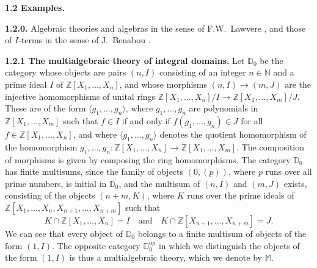 \documentclass{article}
\newenvironment{rmenv}[1]
  {\phantomsection\par\medskip\noindent\textbf{#1.}\rmfamily}
  {\par\medskip}
\newcommand{\bb}[1]{{\mathbb{#1}}}
\newcommand{\op}{{\mathrm{op}}}
\begin{document}
\begin{rmenv}{1.2 Examples}
\label{1.2}

  \begin{rmenv}{1.2.0}
  \label{1.2.0}
    Algebraic theories and algebras in the sense of F.W.~Lawvere \cite{6}, and those of $I$-terms in the sense of J.~Benabou \cite{1}.
  \end{rmenv}

  \begin{rmenv}{1.2.1 The multialgebraic theory of integral domains}
  \label{1.2.1}
    Let $\bb{D}_0$ be the category whose objects are pairs $(n,I)$ consisting of an integer $n\in\bb{N}$ and a prime ideal $I$ of $\bb{Z}[X_1,\ldots,X_n]$, and whose morphisms $(n,I)\to(m,J)$ are the injective homomorphisms of unital rings $\bb{Z}[X_1,\ldots,X_n]/I\to\bb{Z}[X_1,\ldots,X_m]/J$.
    These are of the form $\langle g_1,\ldots,g_n\rangle$, where $g_1,\ldots,g_n$ are polynomials in $\bb{Z}[X_1,\ldots,X_m]$ such that $f\in I$ if and only if $f(g_1,\ldots,g_n)\in J$ for all $f\in\bb{Z}[X_1,\ldots,X_n]$, and where $\langle g_1,\ldots,g_n\rangle$ denotes the quotient homomorphism of the homomorphism $g_1,\ldots,g_n\colon\bb{Z}[X_1,\ldots,X_n]\to\bb{Z}[X_1,\ldots,X_m]$.
    The composition of morphisms is given by composing the ring homomorphisms.
    The category $\bb{D}_0$ has finite multisums, since the family of objects $(0,(p))$, where $p$ runs over all prime numbers, is initial in $\bb{D}_0$, and the multisum of $(n,I)$ and $(m,J)$ exists, consisting of the objects $(n+m,K)$, where $K$ runs over the prime ideals of $\bb{Z}[X_1,\ldots,X_n,X_{n+1},\ldots,X_{n+m}]$ such that
    \[
      K\cap\bb{Z}[X_1,\ldots,X_n] = I
      \quad\text{and}\quad
      K\cap\bb{Z}[X_{n+1},\ldots,X_{n+m}] = J.
    \]
    We can see that every object of $\bb{D}_0$ belongs to a finite multisum of objects of the form $(1,I)$.
    The opposite category $\bb{D}_0^\op$ in which we distinguish the objects of the form $(1,I)$ is thus a multialgebraic theory, which we denote by $\bb{M}$.


\end{rmenv}
\end{rmenv}
\end{document}
